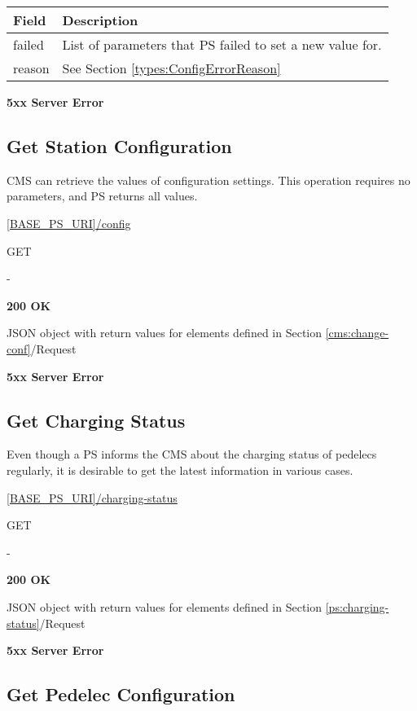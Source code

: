 \begin{tabularx}{\linewidth}{ | l | X | }
  \hline
  \rowcolor{table-head}
  Field & Description \\
  \hline
  failed		& List of parameters that \acs{PS} failed to set a new value for.\\
  reason 	& See Section \ref{types:ConfigErrorReason} \\
  \hline
\end{tabularx}

\textbf{5xx Server Error}

\subsection{Get Station Configuration}

\acs{CMS} can retrieve the values of configuration settings. This operation requires no parameters, and \acs{PS} returns all values.

 \url{[BASE_PS_URI]/config}

 GET

 -

 \textbf{200 OK}

JSON object with return values for elements defined in Section \ref{cms:change-conf}/Request

 \textbf{5xx Server Error}

\subsection{Get Charging Status}

Even though a \acs{PS} informs the \acs{CMS} about the charging status of pedelecs regularly, it is desirable to get the latest information in various cases.

 \url{[BASE_PS_URI]/charging-status}

 GET

 -

 \textbf{200 OK}

JSON object with return values for elements defined in Section \ref{ps:charging-status}/Request

 \textbf{5xx Server Error}

\subsection{Get Pedelec Configuration}


